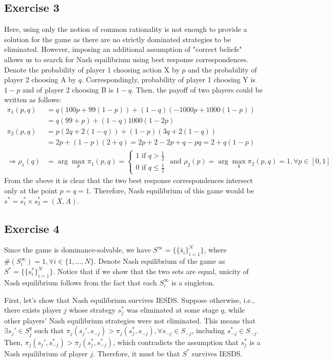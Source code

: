 \documentclass[]{article}
\begin{document}
\subsection*{Exercise 3}

Here, using only the notion of common rationality is not enough to provide a solution for the game as there are no strictly dominated strategies to be eliminated. However, imposing an additional assumption of "correct beliefs" allows us to search for Nash equilibrium using best response correspondences. Denote the probability of player 1 choosing action X by $p$ and the probability of player 2 choosing A by $q$. Correspondingly, probability of player 1 choosing Y is $1-p$ and of player 2 choosing B is $1-q$. Then, the payoff of two players could be written as follows:
\begin{equation}
	\begin{split}
	\pi_1(p, q)& = q(100p + 99(1-p)) + (1-q)(-1000p+1000(1-p)) \\ \nonumber
	& = q(99+p) + (1-q)1000(1-2p) \\
	\pi_2(p, q)& = p(2q + 2(1-q)) + (1-p)(3q + 2(1-q)) \\
	& = 2p + (1-p)(2+q) = 2p + 2 - 2p + q - pq = 2 + q(1-p) \\
	\Longrightarrow \rho_1(q)& =\arg\max\limits_{p}\pi_1(p, q) = \begin{cases}
	1\text{ if }q>\frac{1}{2} \\
	0\text{ if }q\leq\frac{1}{2}
	\end{cases}\text{ and }
	\rho_2(p) = \arg\max\limits_{q}\pi_2(p, q) = 1, \forall p\in[0, 1]
	\end{split}
\end{equation}
From the above it is clear that the two best response correspondences intersect only at the point $p = q = 1$. Therefore, Nash equilibrium of this game would be $s^* = s_1^*\times s_2^* = (X, A)$.

\subsection*{Exercise 4}
Since the game is dominance-solvable, we have $S^\infty = \{\{\hat{s}_i\}_{i = 1}^{N}\}$, where $\#(S_i^\infty) = 1, \forall i\in\{1, \ldots, N\}$. Denote Nash equilibrium of the game as $S^* = \{\{s_i^*\}_{i = 1}^{N}\}$. Notice that if we show that the two sets are equal, unicity of Nash equilibrium follows from the fact that each $S_i^\infty$ is a singleton.

First, let's show that Nash equilibrium survives IESDS. Suppose otherwise, i.e., there exists player $j$ whose strategy $s_j^*$ was eliminated at some stage $q$, while other players' Nash equilibrium strategies were not eliminated. This means that $\exists s_j'\in S_j^q$ such that $\pi_j(s_j', s_{-j}) > \pi_j(s_j^*, s_{-j}), \forall s_{-j}\in S_{-j}$, including $s_{-j}^*\in S_{-j}$. Then, $\pi_j(s_j', s_{-j}^*) > \pi_j(s_j^*, s_{-j}^*)$, which contradicts the assumption that $s_j^*$ is a Nash equilibrium of player $j$. Therefore, it must be that $S^*$ survives IESDS.
\end{document}
